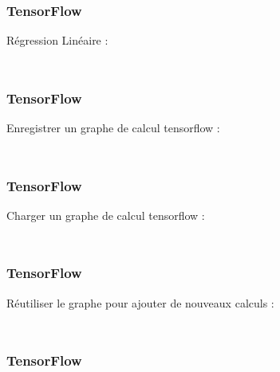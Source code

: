 \begin{frame}
  \frametitle{TensorFlow}
  Régression Linéaire :
  \inputminted[linenos,fontsize=\small,bgcolor=pythonbg]{python}{code-illustration/tf-regression_lineaire_run.py}
  \inputminted[linenos,fontsize=\small,bgcolor=returnbg]{text}{code-illustration/tf-regression_lineaire_run.txt}
\end{frame}

\begin{frame}
  \frametitle{TensorFlow}
  Enregistrer un graphe de calcul tensorflow :
  \inputminted[linenos,fontsize=\small,bgcolor=pythonbg]{python}{code-illustration/tf-save_models.py}
  \inputminted[linenos,fontsize=\small,bgcolor=returnbg]{text}{code-illustration/tf-save_models.txt}
\end{frame}

\begin{frame}
  \frametitle{TensorFlow}
  Charger un graphe de calcul tensorflow :
  \inputminted[linenos,fontsize=\small,bgcolor=pythonbg]{python}{code-illustration/tf-load_models.py}
  \inputminted[linenos,fontsize=\small,bgcolor=returnbg]{text}{code-illustration/tf-load_models.txt}
\end{frame}

\begin{frame}
  \frametitle{TensorFlow}
  Réutiliser le graphe pour ajouter de nouveaux calculs :
  \inputminted[linenos,fontsize=\small,bgcolor=pythonbg]{python}{code-illustration/tf-modify_models.py}
  \inputminted[linenos,fontsize=\small,bgcolor=returnbg]{text}{code-illustration/tf-modify_models.txt}
\end{frame}

\begin{frame}
  \frametitle{TensorFlow}
\end{frame}
